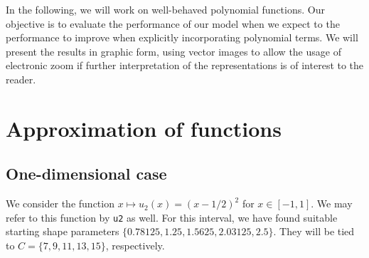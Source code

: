 \documentclass[12pt]{report} %
\begin{document}
In the following, we will work on well-behaved polynomial functions. Our objective is to evaluate the performance of our model when we expect to the performance to improve when explicitly incorporating polynomial terms. We will present the results in graphic form, using vector images to allow the usage of electronic zoom if further interpretation of the representations is of interest to the reader.

\section*{Approximation of functions}



\subsection*{One-dimensional case}

We consider the function $x \mapsto u_2(x)=(x-1/2)^2$ for $x \in [-1,1]$. We may refer to this function by \texttt{u2} as well. For this interval, we have found suitable starting shape parameters $\{0.78125, 1.25, 1.5625, 2.03125, 2.5\}$. They will be tied to $C=\{7,9,11,13,15\}$, respectively.
\end{document}
